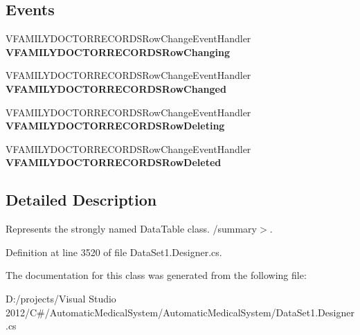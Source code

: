 \subsection*{Events}
\begin{CompactItemize}
\item 
VFAMILYDOCTORRECORDSRowChangeEventHandler \textbf{VFAMILYDOCTORRECORDSRowChanging}\label{class_automatic_medical_system_1_1_data_set1_1_1_v_f_a_m_i_l_y_d_o_c_t_o_r_r_e_c_o_r_d_s_data_table_d83e1bffb065f12646a7329424b67fad}

\item 
VFAMILYDOCTORRECORDSRowChangeEventHandler \textbf{VFAMILYDOCTORRECORDSRowChanged}\label{class_automatic_medical_system_1_1_data_set1_1_1_v_f_a_m_i_l_y_d_o_c_t_o_r_r_e_c_o_r_d_s_data_table_c92c4b0a4315b41829c18086bdb7fa02}

\item 
VFAMILYDOCTORRECORDSRowChangeEventHandler \textbf{VFAMILYDOCTORRECORDSRowDeleting}\label{class_automatic_medical_system_1_1_data_set1_1_1_v_f_a_m_i_l_y_d_o_c_t_o_r_r_e_c_o_r_d_s_data_table_079ef26e5d0205d958f5fd4c3644f28d}

\item 
VFAMILYDOCTORRECORDSRowChangeEventHandler \textbf{VFAMILYDOCTORRECORDSRowDeleted}\label{class_automatic_medical_system_1_1_data_set1_1_1_v_f_a_m_i_l_y_d_o_c_t_o_r_r_e_c_o_r_d_s_data_table_5b59bb88a6e9583ddf6c737216cb6cff}

\end{CompactItemize}


\subsection{Detailed Description}
Represents the strongly named DataTable class. /summary$>$. 

Definition at line 3520 of file DataSet1.Designer.cs.

The documentation for this class was generated from the following file:\begin{CompactItemize}
\item 
D:/projects/Visual Studio 2012/C\#/AutomaticMedicalSystem/AutomaticMedicalSystem/DataSet1.Designer.cs\end{CompactItemize}
